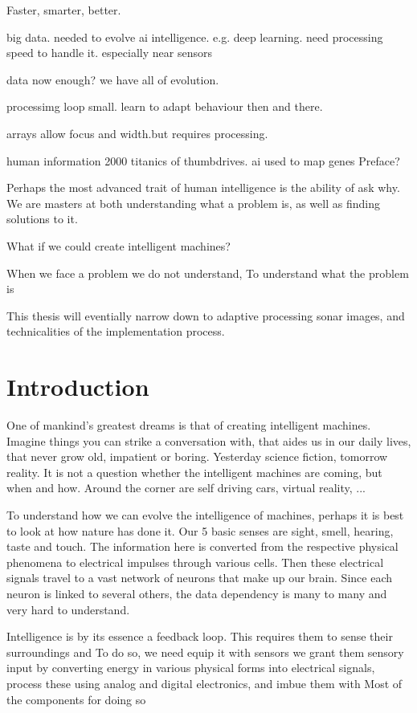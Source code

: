 Faster, smarter, better.

big data. needed to evolve ai intelligence. e.g. deep learning.  need processing speed to handle it. especially near sensors

data now enough? we have all of evolution.

processimg loop small. learn to adapt behaviour then and there.

arrays allow focus and width.but requires processing.

human information 2000 titanics of thumbdrives. ai used to map genes 
Preface?


Perhaps the most advanced trait of human intelligence is the ability of ask why. We are masters at both understanding what a problem is, as well as finding solutions to it. 

What if we could create intelligent machines? 

When we face a problem we do not understand, To understand what the problem is

This thesis will eventially narrow down to adaptive processing sonar images, and technicalities of the implementation process.


\chapter{Introduction}

One of mankind's greatest dreams is that of creating intelligent machines. Imagine things you can strike a conversation with, that aides us in our daily lives, that never grow old, impatient or boring. Yesterday science fiction, tomorrow reality. It is not a question whether the intelligent machines are coming, but when and how. Around the corner are self driving cars, virtual reality, ...

To understand how we can evolve the intelligence of machines, perhaps it is best to look at how nature has done it. Our 5 basic senses are sight, smell, hearing, taste and touch. The information here is converted from the respective physical phenomena to electrical impulses through various cells. Then these electrical signals travel to a vast network of neurons that make up our brain. Since each neuron is linked to several others, the data dependency is many to many and very hard to understand.


Intelligence is by its essence a feedback loop. 
This requires them to sense their surroundings and To do so, we need equip it with sensors we grant them sensory input by converting energy in various physical forms into electrical signals, process these using analog and digital electronics, and imbue them with  Most of the components for doing so 

